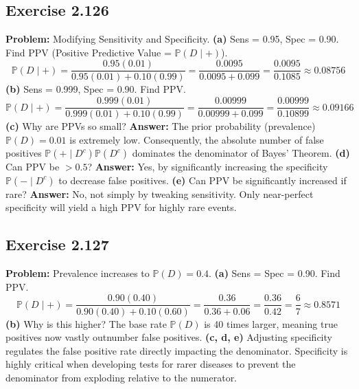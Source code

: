 \documentclass[12pt]{article}
\theoremstyle{definition}
\theoremstyle{remark}
\newcommand{\Pbb}{\mathbb{P}}
\begin{document}
\subsection*{Exercise 2.126}
\textbf{Problem:} Modifying Sensitivity and Specificity.
\textbf{(a)} Sens = 0.95, Spec = 0.90. Find PPV (Positive Predictive Value = $\Pbb(D \mid +)$).
\[ \Pbb(D \mid +) = \frac{0.95(0.01)}{0.95(0.01) + 0.10(0.99)} = \frac{0.0095}{0.0095 + 0.099} = \frac{0.0095}{0.1085} \approx 0.08756 \]
\textbf{(b)} Sens = 0.999, Spec = 0.90. Find PPV.
\[ \Pbb(D \mid +) = \frac{0.999(0.01)}{0.999(0.01) + 0.10(0.99)} = \frac{0.00999}{0.00999 + 0.099} = \frac{0.00999}{0.10899} \approx 0.09166 \]
\textbf{(c)} Why are PPVs so small?
\textbf{Answer:} The prior probability (prevalence) $\Pbb(D) = 0.01$ is extremely low. Consequently, the absolute number of false positives $\Pbb(+ \mid D^c)\Pbb(D^c)$ dominates the denominator of Bayes' Theorem.
\textbf{(d)} Can PPV be $>0.5$?
\textbf{Answer:} Yes, by significantly increasing the specificity $\Pbb(- \mid D^c)$ to decrease false positives. 
\textbf{(e)} Can PPV be significantly increased if rare?
\textbf{Answer:} No, not simply by tweaking sensitivity. Only near-perfect specificity will yield a high PPV for highly rare events.

\subsection*{Exercise 2.127}
\textbf{Problem:} Prevalence increases to $\Pbb(D) = 0.4$.
\textbf{(a)} Sens = Spec = 0.90. Find PPV.
\[ \Pbb(D \mid +) = \frac{0.90(0.40)}{0.90(0.40) + 0.10(0.60)} = \frac{0.36}{0.36 + 0.06} = \frac{0.36}{0.42} = \frac{6}{7} \approx 0.8571 \]
\textbf{(b)} Why is this higher? The base rate $\Pbb(D)$ is 40 times larger, meaning true positives now vastly outnumber false positives.
\textbf{(c, d, e)} Adjusting specificity regulates the false positive rate directly impacting the denominator. Specificity is highly critical when developing tests for rarer diseases to prevent the denominator from exploding relative to the numerator.

\end{document}
